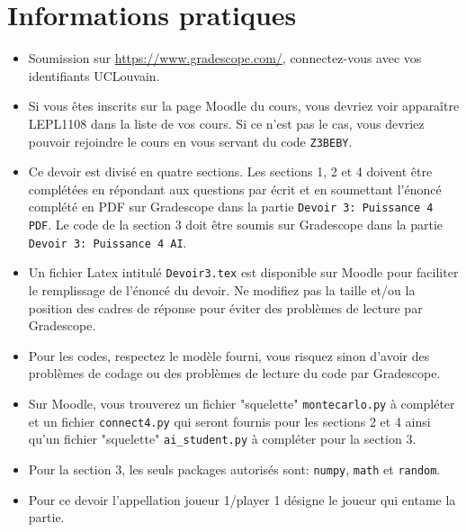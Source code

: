 \documentclass[11pt,answers]{exam}
\begin{document}
\section*{Informations pratiques}
\begin{itemize}
\setlength{\itemsep}{0mm}
	\item Soumission sur \url{https://www.gradescope.com/}, connectez-vous avec vos identifiants UCLouvain.
	\item Si vous êtes inscrits sur la page Moodle du cours, vous devriez voir apparaître LEPL1108 dans la liste de vos cours. Si ce n'est pas le cas, vous devriez pouvoir rejoindre le cours en vous servant du code \texttt{Z3BEBY}. 
        \item Ce devoir est divisé en quatre sections. Les sections 1, 2 et 4 doivent \^etre complétées en répondant aux questions par écrit et en soumettant l'énoncé complété en PDF sur Gradescope dans la partie \texttt{Devoir 3: Puissance 4 PDF}. Le code de la section 3 doit \^etre soumis sur Gradescope dans la partie \texttt{Devoir 3: Puissance 4 AI}.
        \item Un fichier Latex intitulé \texttt{Devoir3.tex} est disponible sur Moodle pour faciliter le remplissage de l'énoncé du devoir. Ne modifiez pas la taille et/ou la position des cadres de réponse pour éviter des problèmes de lecture par Gradescope.
	\item Pour les codes, respectez le modèle fourni, vous risquez sinon d’avoir des problèmes de codage ou des problèmes de lecture du code par Gradescope.
        \item Sur Moodle, vous trouverez un fichier "squelette" \texttt{montecarlo.py} à compléter et un fichier \texttt{connect4.py} qui seront fournis pour les sections 2 et 4 ainsi qu'un fichier "squelette" \texttt{ai\_student.py} à compléter pour la section 3.
	\item Pour la section 3, les seuls packages autorisés sont: \texttt{numpy}, \texttt{math} et \texttt{random}.
        \item Pour ce devoir l'appellation joueur 1/player 1 désigne le joueur qui entame la partie.
\end{itemize}


\newpage
\end{document}
